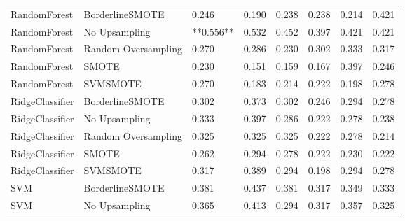 \begin{tabular}{llllllll}
                RandomForest &     BorderlineSMOTE &     0.246 &                     0.190 &                 0.238 &                  0.238 &                                   0.214 &    0.421 \\
                RandomForest &       No Upsampling & **0.556** &                     0.532 &                 0.452 &                  0.397 &                                   0.421 &    0.421 \\
                RandomForest & Random Oversampling &     0.270 &                     0.286 &                 0.230 &                  0.302 &                                   0.333 &    0.317 \\
                RandomForest &               SMOTE &     0.230 &                     0.151 &                 0.159 &                  0.167 &                                   0.397 &    0.246 \\
                RandomForest &            SVMSMOTE &     0.270 &                     0.183 &                 0.214 &                  0.222 &                                   0.198 &    0.278 \\
             RidgeClassifier &     BorderlineSMOTE &     0.302 &                     0.373 &                 0.302 &                  0.246 &                                   0.294 &    0.278 \\
             RidgeClassifier &       No Upsampling &     0.333 &                     0.397 &                 0.286 &                  0.222 &                                   0.278 &    0.238 \\
             RidgeClassifier & Random Oversampling &     0.325 &                     0.325 &                 0.325 &                  0.222 &                                   0.278 &    0.214 \\
             RidgeClassifier &               SMOTE &     0.262 &                     0.294 &                 0.278 &                  0.222 &                                   0.230 &    0.222 \\
             RidgeClassifier &            SVMSMOTE &     0.317 &                     0.389 &                 0.294 &                  0.198 &                                   0.294 &    0.278 \\
                         SVM &     BorderlineSMOTE &     0.381 &                     0.437 &                 0.381 &                  0.317 &                                   0.349 &    0.333 \\
                         SVM &       No Upsampling &     0.365 &                     0.413 &                 0.294 &                  0.317 &                                   0.357 &    0.325 \\

\end{tabular}
